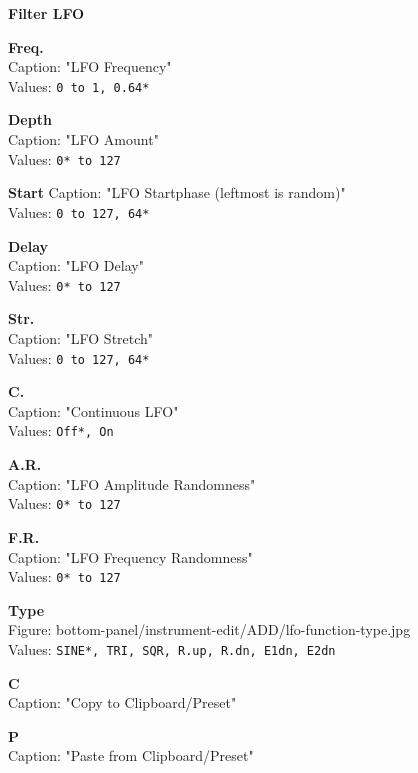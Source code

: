 \documentclass[
 11pt,
 twoside,
 a4paper,
 headinclude,
 footinclude,
 final                                 %
]{article}
\begin{document}
\begin{enumber}
\begin{enumber}
\begin{enumber}
\begin{enumber}
            \item \textbf{Filter LFO}
            \begin{enumber}
               \item \textbf{Freq.} \\
                  Caption: "LFO Frequency" \\
                  Values: \texttt{0 to 1, 0.64*}
               \item \textbf{Depth} \\
                  Caption: "LFO Amount" \\
                  Values: \texttt{0* to 127}
               \item \textbf{Start}
                  Caption: "LFO Startphase (leftmost is random)" \\
                  Values: \texttt{0 to 127, 64*}
               \item \textbf{Delay} \\
                  Caption: "LFO Delay" \\
                  Values: \texttt{0* to 127}
               \item \textbf{Str.} \\
                  Caption: "LFO Stretch" \\
                  Values: \texttt{0 to 127, 64*}
               \item \textbf{C.} \\
                  Caption: "Continuous LFO" \\
                  Values: \texttt{Off*, On}
               \item \textbf{A.R.} \\
                  Caption: "LFO Amplitude Randomness" \\
                  Values: \texttt{0* to 127}
               \item \textbf{F.R.} \\
                  Caption: "LFO Frequency Randomness" \\
                  Values: \texttt{0* to 127}
               \item \textbf{Type} \\
                  Figure: bottom-panel/instrument-edit/ADD/lfo-function-type.jpg \\
                  Values: \texttt{SINE*, TRI, SQR, R.up, R.dn, E1dn, E2dn}
               \item \textbf{C} \\
                  Caption: "Copy to Clipboard/Preset"
               \item \textbf{P} \\
                  Caption: "Paste from Clipboard/Preset"
            \end{enumber}
         \end{enumber}
 

\end{enumber}
\end{enumber}
\end{enumber}
\end{document}

